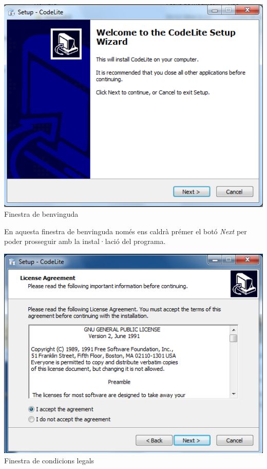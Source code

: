 \documentclass[11pt]{article}
\begin{document}
\begin{center}
\includegraphics[scale=0.4]{img/Installer_2.png}\\
\small{Finestra de benvinguda}\\
\end{center}

\noindent En aquesta finestra de benvinguda només ens caldrà prémer el botó \textit{Next} per poder prosseguir amb la instal·lació del programa.

\begin{center}
\includegraphics[scale=0.4]{img/Installer_3.png}\\
\small{Finestra de condicions legals}\\
\end{center}
\end{document}
